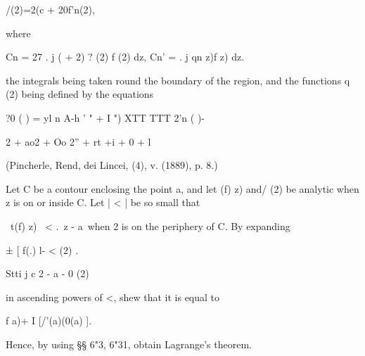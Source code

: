 \begin{wandwmiscexamples}
\begin{wandwmiscexample}
    /(2)=2(c + 20f'n(2),

    where

    Cn = 27 . j ( + 2) ? (2) f (2) dz, Cn' = . j qn z)f z) dz.

    the integrals being taken round the boundary of the region, and the
    functions q (2) being defined by the equations

    ?0 ( ) = yl n A-h ' " + I ") XTT TTT 2'n ( )-

    2 + ao2 + Oo 2'' + rt +i + 0 + l

    (Pincherle, Rend, dei Lincei, (4), v. (1889), p. 8.)
  \end{wandwmiscexample}
  \begin{wandwmiscexample}
    Let C be a contour enclosing the point a, and let (f) z) and/
    (2) be analytic when z is on or inside C. Let | < | be so small that

    \ t(f) z) \ < .\ z - a\ when 2 is on the periphery of C. By expanding

    ± [ f(.) l- < (2) .

    Stti j c 2 - a - 0 (2)

    in ascending powers of <, shew that it is equal to

    f a)+ I [/'(a)(0(a) ].

    Hence, by using §§ 6"3, 6"31, obtain Lagrange's theorem.
  \end{wandwmiscexample}
\end{wandwmiscexamples}